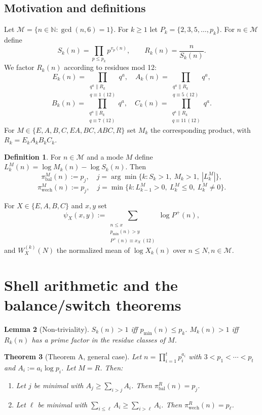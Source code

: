 \documentclass{article}
\newtheorem{theorem}{Theorem}[section]
\newtheorem{lemma}[theorem]{Lemma}
\theoremstyle{definition}
\newtheorem{definition}[theorem]{Definition}
\newcommand{\N}{\mathbb{N}}
\begin{document}
	\subsection{Motivation and definitions}
	Let $\mathcal M=\{n\in\N:\gcd(n,6)=1\}$. For $k\ge 1$ let $P_k=\{2,3,5,\dots,p_k\}$. For $n\in\mathcal M$ define
	\[
	S_k(n)=\prod_{p\le p_k} p^{v_p(n)}, \qquad R_k(n)=\frac{n}{S_k(n)}.
	\]
	We factor $R_k(n)$ according to residues mod 12:
	\[
	E_k(n)=\prod_{\substack{q^a\parallel R_k \\ q\equiv 1\,(12)}} q^a,\quad
	A_k(n)=\prod_{\substack{q^a\parallel R_k \\ q\equiv 5\,(12)}} q^a,
	\]
	\[
	B_k(n)=\prod_{\substack{q^a\parallel R_k \\ q\equiv 7\,(12)}} q^a,\quad
	C_k(n)=\prod_{\substack{q^a\parallel R_k \\ q\equiv 11\,(12)}} q^a.
	\]
	For $M\in\{E,A,B,C,EA,BC,ABC,R\}$ set $M_k$ the corresponding product, with $R_k=E_kA_kB_kC_k$.
	
	\begin{definition}
		For $n\in\mathcal M$ and a mode $M$ define $L_k^M(n)=\log M_k(n)-\log S_k(n)$. Then
		\[
		\pi_{\mathrm{bal}}^M(n):=p_j,\quad j=\arg\min\{k: S_k>1,\ M_k>1,\ |L_k^M|\},
		\]
		\[
		\pi_{\mathrm{wech}}^M(n):=p_j,\quad j=\min\{k: L_{k-1}^M>0,\ L_k^M\le 0,\ L_k^M\neq 0\}.
		\]
	\end{definition}
	
	For $X\in\{E,A,B,C\}$ and $x,y$ set
	\[
	\psi_X(x,y) := \sum_{\substack{n\le x\\ p_{\min}(n)>y\\ P^+(n)\equiv x_X\,(12)}} \log P^+(n),
	\]
	and $W_X^{(k)}(N)$ the normalized mean of $\log X_k(n)$ over $n\le N, n\in\mathcal M$.
	
	\section{Shell arithmetic and the balance/switch theorems}
	
	\begin{lemma}[Non-triviality]
		$S_k(n)>1$ iff $p_{\min}(n)\le p_k$. $M_k(n)>1$ iff $R_k(n)$ has a prime factor in the residue classes of $M$.
	\end{lemma}
	
	\begin{theorem}[Theorem A, general case]
		Let $n=\prod_{i=1}^t p_i^{a_i}$ with $3<p_1<\cdots<p_t$ and $A_i:=a_i\log p_i$. Let $M=R$. Then:
		\begin{enumerate}
			\item Let $j$ be minimal with $A_j\ge \sum_{i>j}A_i$. Then $\pi_{\mathrm{bal}}^R(n)=p_j$.
			\item Let $\ell$ be minimal with $\sum_{i\le \ell}A_i\ge \sum_{i>\ell}A_i$. Then $\pi_{\mathrm{wech}}^R(n)=p_\ell$.
		\end{enumerate}
	\end{theorem}
	
\end{document}
